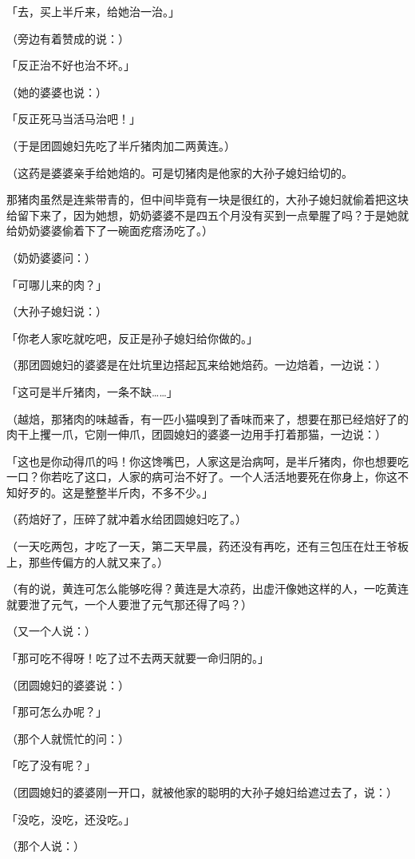\documentclass[UTF8]{ctexart}
\begin{document}
「去，买上半斤来，给她治一治。」

（旁边有着赞成的说：）

「反正治不好也治不坏。」

（她的婆婆也说：）

「反正死马当活马治吧！」

（于是团圆媳妇先吃了半斤猪肉加二两黄连。）

（这药是婆婆亲手给她焙的。可是切猪肉是他家的大孙子媳妇给切的。

那猪肉虽然是连紫带青的，但中间毕竟有一块是很红的，大孙子媳妇就偷着把这块给留下来了，因为她想，奶奶婆婆不是四五个月没有买到一点晕腥了吗？于是她就给奶奶婆婆偷着下了一碗面疙瘩汤吃了。）

（奶奶婆婆问：）

「可哪儿来的肉？」

（大孙子媳妇说：）

「你老人家吃就吃吧，反正是孙子媳妇给你做的。」

（那团圆媳妇的婆婆是在灶坑里边搭起瓦来给她焙药。一边焙着，一边说：）

「这可是半斤猪肉，一条不缺……」

（越焙，那猪肉的味越香，有一匹小猫嗅到了香味而来了，想要在那已经焙好了的肉干上攫一爪，它刚一伸爪，团圆媳妇的婆婆一边用手打着那猫，一边说：）

「这也是你动得爪的吗！你这馋嘴巴，人家这是治病呵，是半斤猪肉，你也想要吃一口？你若吃了这口，人家的病可治不好了。一个人活活地要死在你身上，你这不知好歹的。这是整整半斤肉，不多不少。」

（药焙好了，压碎了就冲着水给团圆媳妇吃了。）

（一天吃两包，才吃了一天，第二天早晨，药还没有再吃，还有三包压在灶王爷板上，那些传偏方的人就又来了。）

（有的说，黄连可怎么能够吃得？黄连是大凉药，出虚汗像她这样的人，一吃黄连就要泄了元气，一个人要泄了元气那还得了吗？）

（又一个人说：）

「那可吃不得呀！吃了过不去两天就要一命归阴的。」

（团圆媳妇的婆婆说：）

「那可怎么办呢？」

（那个人就慌忙的问：）

「吃了没有呢？」

（团圆媳妇的婆婆刚一开口，就被他家的聪明的大孙子媳妇给遮过去了，说：）

「没吃，没吃，还没吃。」

（那个人说：）
\end{document}
